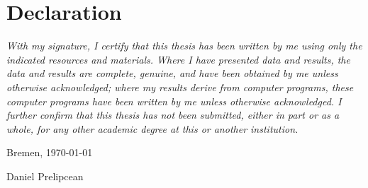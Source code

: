 \documentclass[twoside,a4paper,11pt]{article}
\numberwithin{equation}{section}
\begin{document}
\newpage
\fi






\section*{Declaration}
\textit{With my signature, I certify that this thesis has been written by me using only the indicated resources and materials. Where I have presented data and results, the data and results are complete, genuine, and have been obtained by me unless otherwise acknowledged; where my results derive from computer programs, these computer programs have been written by me unless otherwise acknowledged. I further confirm that this thesis has not been submitted, either in part or as a whole, for any other academic degree at this or another institution.}\\

\vspace{1em}
\begin{multicols}{2}
\raggedright
Bremen, \today

\raggedleft
Daniel Prelipcean\\
\end{multicols}
\end{document}
